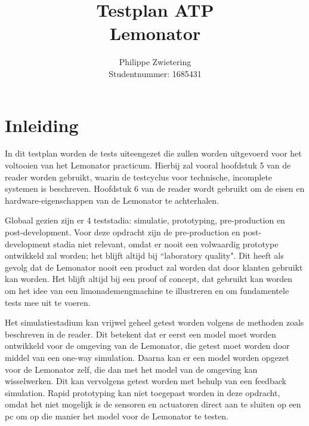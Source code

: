 \documentclass{article}
\title{Testplan ATP\\
		   Lemonator}
\author{Philippe Zwietering\\
	           Studentnummer: 1685431}
\begin{document}
	\maketitle
	
	\clearpage
	
	\section{Inleiding}
	In dit testplan worden de tests uiteengezet die zullen worden uitgevoerd voor het voltooien van het Lemonator practicum. Hierbij zal vooral hoofdstuk 5 van de reader worden gebruikt, waarin de testcyclus voor technische, incomplete systemen is beschreven. Hoofdstuk 6 van de reader wordt gebruikt om de eisen en hardware-eigenschappen van de Lemonator te achterhalen. 
	
	Globaal gezien zijn er 4 teststadia: simulatie, prototyping, pre-production en post-development. Voor deze opdracht zijn de pre-production en post-development stadia niet relevant, omdat er nooit een volwaardig prototype ontwikkeld zal worden; het blijft altijd bij ``laboratory quality". Dit heeft als gevolg dat de Lemonator nooit een product zal worden dat door klanten gebruikt kan worden. Het blijft altijd bij een proof of concept, dat gebruikt kan worden om het idee van een limonademengmachine te illustreren en om fundamentele tests mee uit te voeren.
	
	Het simulatiestadium kan vrijwel geheel getest worden volgens de methoden zoals beschreven in de reader. Dit betekent dat er eerst een model moet worden ontwikkeld voor de omgeving van de Lemonator, die getest moet worden door middel van een one-way simulation. Daarna kan er een model worden opgezet voor de Lemonator zelf, die dan met het model van de omgeving kan wisselwerken. Dit kan vervolgens getest worden met behulp van een feedback simulation. Rapid prototyping kan niet toegepast worden in deze opdracht, omdat het niet mogelijk is de sensoren en actuatoren direct aan te sluiten op een pc om op die manier het model voor de Lemonator te testen. 
	
\end{document}
